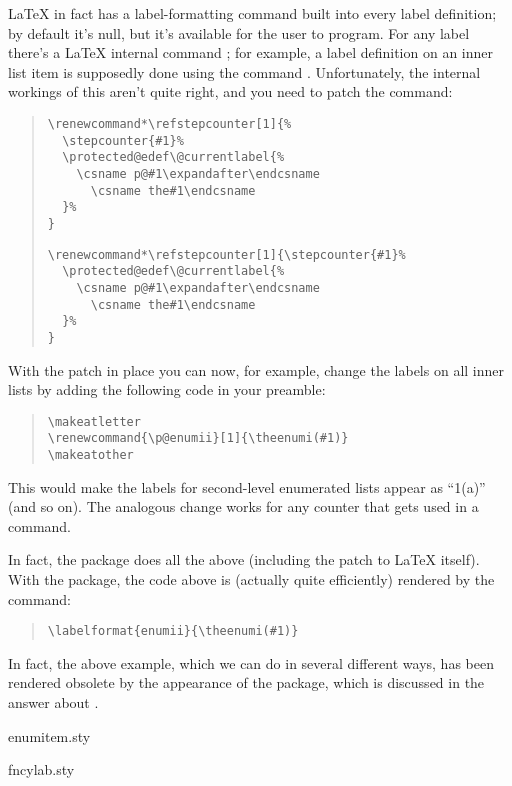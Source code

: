 \LaTeX{} in fact has a label-formatting command built into every label
definition; by default it's null, but it's available for the user to
program.  For any label  there's a \LaTeX{} internal
command ; for example, a label definition
on an inner list item is supposedly done using the command
.  Unfortunately, the internal
workings of this aren't quite right, and you need to patch the
 command:
\begin{quote}
\begin{narrowversion}
\begin{verbatim}
\renewcommand*\refstepcounter[1]{%
  \stepcounter{#1}%
  \protected@edef\@currentlabel{%
    \csname p@#1\expandafter\endcsname
      \csname the#1\endcsname
  }%
}
\end{verbatim}
\end{narrowversion}
\begin{wideversion}
\begin{verbatim}
\renewcommand*\refstepcounter[1]{\stepcounter{#1}%
  \protected@edef\@currentlabel{%
    \csname p@#1\expandafter\endcsname
      \csname the#1\endcsname
  }%
}
\end{verbatim}
\end{wideversion}
\end{quote}
With the patch in place you can now, for example, change the labels on
all inner lists by adding the following code in your preamble:
\begin{quote}
\begin{verbatim}
\makeatletter
\renewcommand{\p@enumii}[1]{\theenumi(#1)}
\makeatother
\end{verbatim}
\end{quote}
This would make the labels for second-level enumerated lists appear as
``1(a)'' (and so on).  The analogous change works for any counter that
gets used in a  command.

In fact, the  package does all the above (including
the patch to \LaTeX{} itself).  With the package, the code above is
(actually quite efficiently) rendered by the command:
\begin{quote}
\begin{verbatim}
\labelformat{enumii}{\theenumi(#1)}
\end{verbatim}
\end{quote}
In fact, the above example, which we can do in several different ways,
has been rendered obsolete by the appearance of the 
package, which is discussed in the answer about %
.
\begin{ctanrefs}
\item[enumitem.sty]
\item[fncylab.sty]
\end{ctanrefs}

